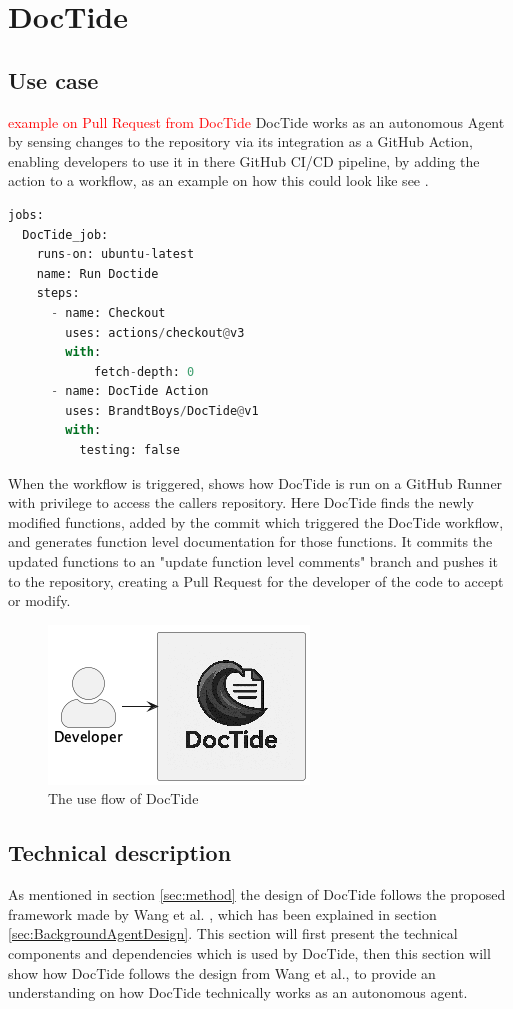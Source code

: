 \section{DocTide}
\label{sec:DesignDocTide}
\subsection{Use case}
\textcolor{red}{example on Pull Request from DocTide }
DocTide works as an autonomous Agent by sensing changes to the repository via its integration as a GitHub Action, enabling developers to use it in there GitHub CI/CD pipeline, by adding the action to a workflow, as an example on how this could look like see .
\begin{lstlisting}[language=Python, label={lst:flow}, caption=Example on how to use DocTide in a workflow]
jobs:
  DocTide_job:
    runs-on: ubuntu-latest
    name: Run Doctide
    steps:
      - name: Checkout
        uses: actions/checkout@v3
        with:
            fetch-depth: 0
      - name: DocTide Action
        uses: BrandtBoys/DocTide@v1
        with:
          testing: false
\end{lstlisting}
When the workflow is triggered,  shows how DocTide is run on a GitHub Runner with privilege to access the callers repository. Here DocTide finds the newly modified functions, added by the commit which triggered the DocTide workflow, and generates function level documentation for those functions. It commits the updated functions to an "update function level comments" branch and pushes it to the repository, creating a Pull Request for the developer of the code to accept or modify.
\begin{figure}[H]
\centering
\includegraphics[width=0.7\linewidth]{Figures/doctide_flow.png}
\caption{The use flow of DocTide}
\label{fig:flow_doctide}
\end{figure}
\subsection{Technical description}
As mentioned in section \ref{sec:method} the design of DocTide follows the proposed framework made by Wang et al. \cite{wang2024survey}, which has been explained in section \ref{sec:BackgroundAgentDesign}. This section will first present the technical components and dependencies which is used by DocTide, then this section will show how DocTide follows the design from Wang et al., to provide an understanding on how DocTide technically works as an autonomous agent.

